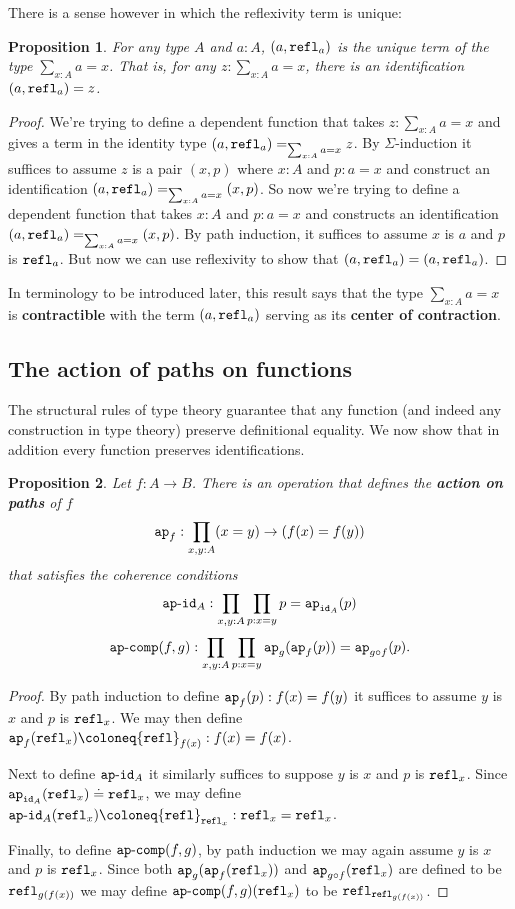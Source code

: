 \documentclass{amsart}
\theoremstyle{theorem}
\newtheorem*{prop}{Proposition}
\theoremstyle{definition}
\theoremstyle{remark}
\newcommand{\0}{\mathbbe{0}}
\newcommand{\1}{\mathbbe{1}}
\newcommand{\2}{\mathbbe{2}}
\newcommand{\3}{\mathbbe{3}}
\newcommand{\4}{\mathbbe{4}}
\newcommand{\term}[1]{{\textup{\texttt{#1}}}}
\newcommand{\id}{\term{id}}
\newcommand{\refl}{\term{refl}}
\newcommand{\ap}{\term{ap}}
\newcommand{\apcoh}[1]{\term{ap}\text{-}\term{#1}}
\begin{document}
There is a sense however in which the reflexivity term is unique:

\begin{prop} For any type $A$ and $a : A$, $(a, \refl_a)$ is the unique term of the type $\sum_{x : A} a =x$. That is, for any $z : \sum_{x :A} a =x$, there is an identification $(a, \refl_a) = z$.
\end{prop}
\begin{proof} We're trying to define a dependent function that takes $z : \sum_{x :A} a =x$ and gives a term in the identity type $(a,\refl_a) =_{\sum_{x :A} a =x} z$. By $\Sigma$-induction it suffices to assume $z$ is a pair $(x,p)$ where $x :A$ and $p : a =x$ and construct an identification $(a, \refl_a) =_{\sum_{x :A} a =x} (x,p)$. So now we're trying to define a dependent function that takes $x :A$ and $p : a =x$ and constructs an identification $(a, \refl_a) =_{\sum_{x :A} a =x} (x,p)$. By path induction, it suffices to assume $x$ is $a$ and $p$ is $\refl_a$. But now we can use reflexivity to show that $(a, \refl_a) = (a, \refl_a)$.
\end{proof}

In terminology to be introduced later, this result says that the type $\sum_{x : A} a =x$ is \textbf{contractible} with the term  $(a, \refl_a)$ serving as its \textbf{center of contraction}.


\subsection*{The action of paths on functions}

The structural rules of type theory guarantee that any function (and indeed any construction in type theory) preserve definitional equality. We now show that in addition every function preserves identifications.

\begin{prop} Let $f \colon A \to B$. There is an operation that defines the \textbf{action on paths} of $f$
\[ \ap_f : \prod_{x,y :A} (x=y) \to (f(x) = f(y))\]
that satisfies the coherence conditions
\[ \apcoh{id}_A : \prod_{x,y:A} \prod_{p : x= y} p = \ap_{\id_A}(p)\]
\[ \apcoh{comp}(f,g) : \prod_{x,y:A} \prod_{p: x=y} \ap_g(\ap_f(p))= \ap_{g\circ f}(p).\]
\end{prop}
\begin{proof}
By path induction to define $\ap_f(p) : f(x)=f(y)$ it suffices to assume $y$ is $x$ and $p$ is $\refl_x$. We may then define $\ap_f(\refl_x) \coloneq \refl_{f(x)} : f(x) = f(x)$.

Next to define $\apcoh{id}_A$ it similarly suffices to suppose $y$ is $x$ and $p$ is $\refl_x$. Since $\ap_{\id_A}(\refl_x)\doteq \refl_x$, we may define $\apcoh{id}_A(\refl_x) \coloneq \refl_{\refl_x} : \refl_x = \refl_x$.

Finally, to define $\apcoh{comp}(f,g)$, by path induction we may again assume $y$ is $x$ and $p$ is $\refl_x$. Since both $\ap_g(\ap_f(\refl_x))$ and $\ap_{g \circ f}(\refl_x)$ are defined to be $\refl_{g(f(x))}$ we may define $\apcoh{comp}(f,g)(\refl_x)$ to be $\refl_{\refl_{g(f(x))}}$.
\end{proof}
\end{document}
